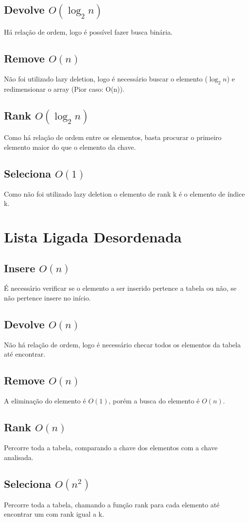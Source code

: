 \documentclass{article}
\begin{document}
\subsection{Devolve $O(\log_{2}n)$}
Há relação de ordem, logo é possível fazer busca binária.
\subsection{Remove $O(n)$}
Não foi utilizado lazy deletion, logo é necessário buscar o elemento ($\log_{2}n$) e redimensionar o array (Pior 
caso: O(n)).
\subsection{Rank $O(\log_{2}n)$}
Como há relação de ordem entre os elementos, basta procurar o primeiro elemento maior do que o elemento da 
chave.
\subsection{Seleciona $O(1)$}
Como não foi utilizado lazy deletion o elemento de rank k é o elemento de índice k.

\section{Lista Ligada Desordenada}

\subsection{Insere $O(n)$} 
É necessário verificar se o elemento a ser inserido pertence a tabela ou não, se não pertence insere no início.
\subsection{Devolve $O(n)$}
Não há relação de ordem, logo é necessário checar todos os elementos da tabela até encontrar.
\subsection{Remove $O(n)$}
A eliminação do elemento é $O(1)$, porém a busca do elemento é $O(n)$.
\subsection{Rank $O(n)$}
Percorre toda a tabela, comparando a chave dos elementos com a chave analisada.
\subsection{Seleciona $O(n^2)$}
Percorre toda a tabela, chamando a função rank para cada elemento até encontrar um com rank igual a k.
\end{document}
